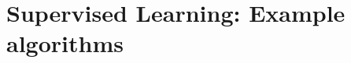 \documentclass[xcolor=pdftex,dvipsnames,table]{beamer}
\begin{document}



\section{Supervised Learning: Example algorithms}


\end{document}
